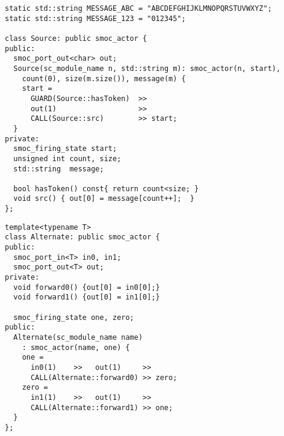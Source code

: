 \begin{frame}[fragile=singleslide]
\begin{lstlisting}
static std::string MESSAGE_ABC = "ABCDEFGHIJKLMNOPQRSTUVWXYZ";
static std::string MESSAGE_123 = "012345";

class Source: public smoc_actor {
public:
  smoc_port_out<char> out;
  Source(sc_module_name n, std::string m): smoc_actor(n, start),
    count(0), size(m.size()), message(m) {
    start = 
      GUARD(Source::hasToken)  >>
      out(1)                   >>
      CALL(Source::src)        >> start;
  }
private:
  smoc_firing_state start;
  unsigned int count, size;
  std::string  message;

  bool hasToken() const{ return count<size; }
  void src() { out[0] = message[count++];  }
};
\end{lstlisting}
\end{frame}





\begin{frame}[fragile=singleslide]
\begin{lstlisting}
template<typename T>
class Alternate: public smoc_actor {
public:
  smoc_port_in<T> in0, in1;
  smoc_port_out<T> out;
private:
  void forward0() {out[0] = in0[0];}
  void forward1() {out[0] = in1[0];}

  smoc_firing_state one, zero;
public:
  Alternate(sc_module_name name)
    : smoc_actor(name, one) {
    one =
      in0(1)    >>   out(1)     >>
      CALL(Alternate::forward0) >> zero;
    zero =
      in1(1)    >>   out(1)     >>
      CALL(Alternate::forward1) >> one;
  }
};
\end{lstlisting}
\end{frame}





